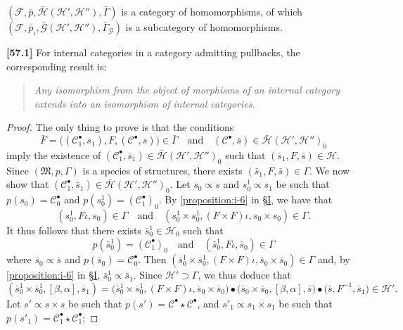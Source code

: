 \documentclass[a4paper,fleqn]{article}
\theoremstyle{plain}
\newenvironment{theorem}[1]
  {\renewcommand\theinnertheorem{#1}\innertheorem}
  {\endinnertheorem}
\theoremstyle{definition}
\newenvironment{longcomm}[1]
  {\noindent\textbf{[#1]}\rmfamily}
  {}
\newcommand{\textand}{\quad\text{and}\quad}
\newcommand{\CC}{\mathcal{C}}
\newcommand{\HH}{\mathcal{H}}
\newcommand{\bHH}{\bar{\HH}}
\newcommand{\MM}{\mathfrak{M}}
\newcommand{\FF}{\mathcal{F}}
\newcommand{\subs}{\mathrel{\propto}}
\newcommand{\GG}{\mathcal{G}}
\begin{document}
\begin{theorem}{1}
  \label{theorem:ii-1}
  $(\FF,\bar{p},\bHH(\HH',\HH''),\bar{\Gamma})$ is a category of homomorphisms, of which $(\FF,\bar{p}_\iota,\bar{\GG}(\HH',\HH''),\bar{\Gamma}_\GG)$ is a subcategory of homomorphisms.
\end{theorem}

\begin{longcomm}{57.1}
  For internal categories in a category admitting pullbacks, the corresponding result is:
  \begin{quote}
    \itshape
    Any isomorphism from the object of morphisms of an internal category extends into an isomorphism of internal categories.
  \end{quote}
\end{longcomm}

\begin{proof}
  The only thing to prove is that the conditions
  \[
    \bar{F}
    = \big((\CC_1^\bullet,s_1),F,(\CC^\bullet,s)\big)
    \in\bar{\Gamma}
    \textand
    (\CC^\bullet,\bar{s})
    \in\bHH(\HH',\HH'')_0
  \]
  imply the existence of $(\CC_1^\bullet,\bar{s}_1)\in\bHH(\HH',\HH'')_0$ such that $(\bar{s}_1,F,\bar{s})\in\HH$.
  Since $(\MM,p,\Gamma)$ is a species of structures, there exists $(\bar{s}_1,F,\bar{s})\in\Gamma$.
  We now show that $(\CC_1^\bullet,\bar{s}_1)\in\bHH(\HH',\HH'')_0$.
  Let $s_0\subs s$ and $s_0^1\subs s_1$ be such that $p(s_0)=\CC_0^\bullet$ and $p(s_0^1)=(\CC_1^\bullet)_0$.
  By \cref{proposition:i-6} in \hyperref[section:i]{§I}, we have that
  \[
    (s_0^1,F\iota,s_0)
    \in\Gamma
    \textand
    (s_0^1\times s_0^1,(F\times F)\iota,s_0\times s_0)
    \in\Gamma.
  \]
  It thus follows that there exists $\bar{s}_0^1\in\HH_0$ such that
  \[
    p(\bar{s}_0^1)
    = (\CC_1^\bullet)_0
    \textand
    (\bar{s}_0^1,F\iota,\bar{s}_0)
    \in\Gamma
  \]
  where $\bar{s}_0\subs\bar{s}$ and $p(\bar{s}_0)=\CC_0^\bullet$.
  Then $(\bar{s}_0^1\times\bar{s}_0^1,(F\times F)\iota,\bar{s}_0\times\bar{s}_0)\in\Gamma$ and, by \cref{proposition:i-6} in \hyperref[section:i]{§I}, $\bar{s}_0^1\subs\bar{s}_1$.
  Since $\HH'\supset\Gamma$, we thus deduce that
  \[
    (\bar{s}_0^1\times\bar{s}_0^1,[\beta,\alpha],\bar{s}_1)
    = \big(
      \bar{s}_0^1\times\bar{s}_0^1, (F\times F)\iota, \bar{s}_0\times\bar{s}_0
    \big)
    \bullet \big(
      \bar{s}_0\times\bar{s}_0, [\beta,\alpha], \bar{s}
    \big)
    \bullet \big(
      \bar{s}, F^{-1}, \bar{s}_1
    \big)
    \in \HH'.
  \]
  Let $s'\subs s\times s$ be such that $p(s')=\CC^\bullet\star\CC^\bullet$, and $s'_1\subs s_1\times s_1$ be such that $p(s'_1)=\CC_1^\bullet\star\CC_1^\bullet$;

\end{proof}
\end{document}
